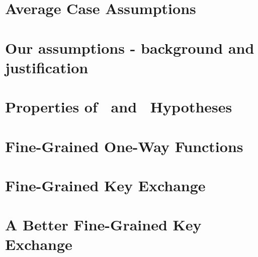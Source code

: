 \section{Average Case Assumptions}\label{sec:averageCaseAssumptions}


\section{Our assumptions - background and justification}\label{sec:justifyAssumptions}


\section{Properties of \kSum~and \zkclique~Hypotheses}\label{sec:kcliqueksumAllTHeThings}


\section{Fine-Grained One-Way Functions}\label{sec:fg-owfs}


\section{Fine-Grained Key Exchange}\label{sec:FineGrainedKeyExchange}



\section{A Better Fine-Grained Key Exchange}\label{sec:n2-gap-keyxc}


%





